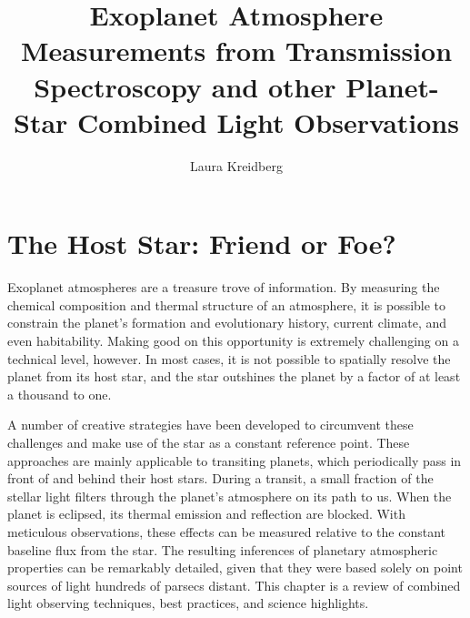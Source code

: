 \documentclass[graybox,natbib,nosecnum]{svmult}
\begin{document}
\title*{Exoplanet Atmosphere Measurements from Transmission Spectroscopy and other Planet-Star Combined Light Observations}
\author{Laura Kreidberg}
%
%
\maketitle



\section{The Host Star: Friend or Foe?}
Exoplanet atmospheres are a treasure trove of information. By measuring the chemical composition and thermal structure of an atmosphere, it is possible to constrain the planet's formation and evolutionary history, current climate, and even habitability.  Making good on this opportunity is extremely challenging on a technical level, however. In most cases, it is not possible to spatially resolve the planet from its host star, and the star outshines the planet by a factor of at least a thousand to one.  

A number of creative strategies have been developed to circumvent these challenges and make use of the star as a constant reference point.  These approaches are mainly applicable to transiting planets, which periodically pass in front of and behind their host stars. During a transit, a small fraction of the stellar light filters through the planet's atmosphere on its path to us. When the planet is eclipsed, its thermal emission and reflection are blocked.  With meticulous observations, these effects can be measured relative to the constant baseline flux from the star. The resulting inferences of planetary atmospheric properties can be remarkably detailed, given that they were based solely on point sources of light hundreds of parsecs distant.  This chapter is a review of combined light observing techniques, best practices, and science highlights. %
\end{document}
